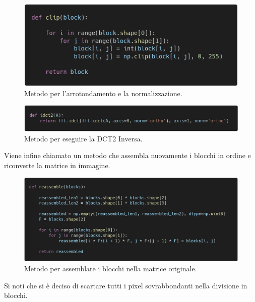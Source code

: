 \documentclass[12pt]{article}
\begin{document}
\begin{figure}[!ht]
    \begin{center}
    \includegraphics[scale=0.3]{images/code_clip.png}
    \caption{Metodo per l'arrotondamento e la normalizzazione.}
    \end{center}
\end{figure}

\begin{figure}[!ht]
    \begin{center}
    \includegraphics[scale=0.3]{images/code_idct2.png}
    \caption{Metodo per eseguire la DCT2 Inversa.}
    \end{center}
\end{figure}

Viene infine chiamato un metodo che assembla nuovamente i blocchi in ordine e riconverte la matrice in immagine.

\begin{figure}[!ht]
    \begin{center}
    \includegraphics[scale=0.3]{images/code_reassemble.png}
    \caption{Metodo per assemblare i blocchi nella matrice originale.}
    \end{center}
\end{figure}

Si noti che si è deciso di scartare tutti i pixel sovrabbondanti nella divisione in blocchi.
\end{document}
